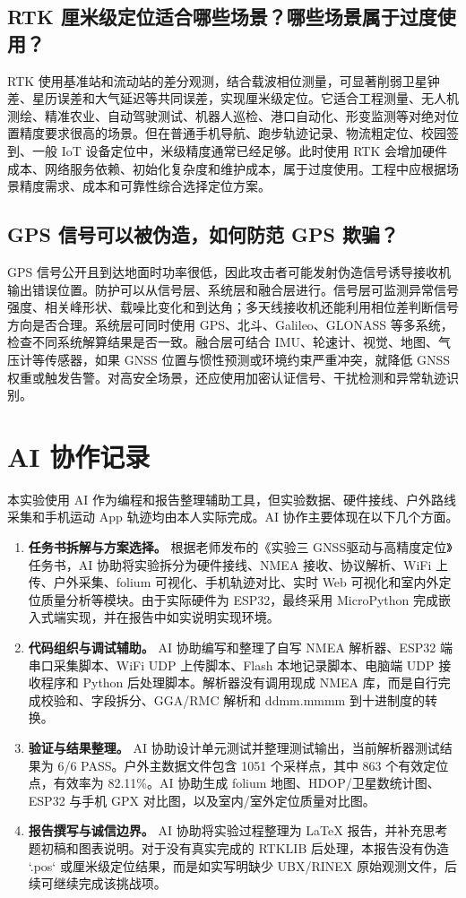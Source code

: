\documentclass[UTF8,a4paper,12pt]{ctexart}
\begin{document}
\subsection{RTK 厘米级定位适合哪些场景？哪些场景属于过度使用？}
RTK 使用基准站和流动站的差分观测，结合载波相位测量，可显著削弱卫星钟差、星历误差和大气延迟等共同误差，实现厘米级定位。它适合工程测量、无人机测绘、精准农业、自动驾驶测试、机器人巡检、港口自动化、形变监测等对绝对位置精度要求很高的场景。但在普通手机导航、跑步轨迹记录、物流粗定位、校园签到、一般 IoT 设备定位中，米级精度通常已经足够。此时使用 RTK 会增加硬件成本、网络服务依赖、初始化复杂度和维护成本，属于过度使用。工程中应根据场景精度需求、成本和可靠性综合选择定位方案。

\subsection{GPS 信号可以被伪造，如何防范 GPS 欺骗？}
GPS 信号公开且到达地面时功率很低，因此攻击者可能发射伪造信号诱导接收机输出错误位置。防护可以从信号层、系统层和融合层进行。信号层可监测异常信号强度、相关峰形状、载噪比变化和到达角；多天线接收机还能利用相位差判断信号方向是否合理。系统层可同时使用 GPS、北斗、Galileo、GLONASS 等多系统，检查不同系统解算结果是否一致。融合层可结合 IMU、轮速计、视觉、地图、气压计等传感器，如果 GNSS 位置与惯性预测或环境约束严重冲突，就降低 GNSS 权重或触发告警。对高安全场景，还应使用加密认证信号、干扰检测和异常轨迹识别。

\clearpage
\section{AI 协作记录}
本实验使用 AI 作为编程和报告整理辅助工具，但实验数据、硬件接线、户外路线采集和手机运动 App 轨迹均由本人实际完成。AI 协作主要体现在以下几个方面。

\begin{enumerate}
\item \textbf{任务书拆解与方案选择。} 根据老师发布的《实验三 GNSS驱动与高精度定位》任务书，AI 协助将实验拆分为硬件接线、NMEA 接收、协议解析、WiFi 上传、户外采集、folium 可视化、手机轨迹对比、实时 Web 可视化和室内外定位质量分析等模块。由于实际硬件为 ESP32，最终采用 MicroPython 完成嵌入式端实现，并在报告中如实说明实现环境。
\item \textbf{代码组织与调试辅助。} AI 协助编写和整理了自写 NMEA 解析器、ESP32 端串口采集脚本、WiFi UDP 上传脚本、Flash 本地记录脚本、电脑端 UDP 接收程序和 Python 后处理脚本。解析器没有调用现成 NMEA 库，而是自行完成校验和、字段拆分、GGA/RMC 解析和 ddmm.mmmm 到十进制度的转换。
\item \textbf{验证与结果整理。} AI 协助设计单元测试并整理测试输出，当前解析器测试结果为 6/6 PASS。户外主数据文件包含 1051 个采样点，其中 863 个有效定位点，有效率为 82.11\%。AI 协助生成 folium 地图、HDOP/卫星数统计图、ESP32 与手机 GPX 对比图，以及室内/室外定位质量对比图。
\item \textbf{报告撰写与诚信边界。} AI 协助将实验过程整理为 LaTeX 报告，并补充思考题初稿和图表说明。对于没有真实完成的 RTKLIB 后处理，本报告没有伪造 `.pos` 或厘米级定位结果，而是如实写明缺少 UBX/RINEX 原始观测文件，后续可继续完成该挑战项。
\end{enumerate}
\end{document}
